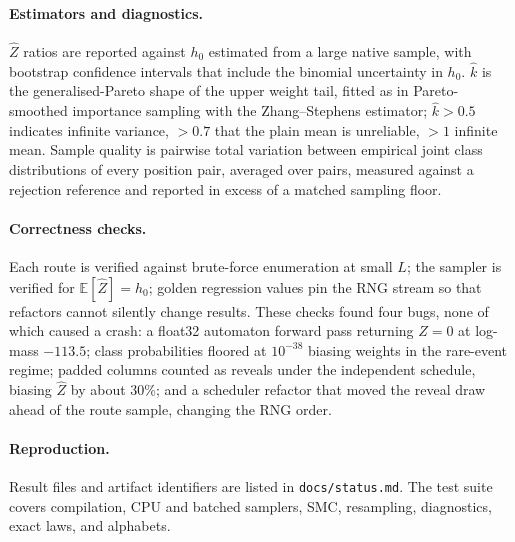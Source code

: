 \documentclass[11pt]{article}
\theoremstyle{definition}
\newcommand{\E}{\mathbb{E}}
\newcommand{\Zh}{\widehat Z}
\begin{document}
\paragraph{Estimators and diagnostics.}
$\Zh$ ratios are reported against $h_0$ estimated from a large native sample, with bootstrap confidence intervals
that include the binomial uncertainty in $h_0$. $\hat k$ is the generalised-Pareto shape of the upper weight tail,
fitted as in Pareto-smoothed importance sampling with the Zhang--Stephens estimator; $\hat k>0.5$ indicates
infinite variance, $>0.7$ that the plain mean is unreliable, $>1$ infinite mean. Sample quality is pairwise total
variation between empirical joint class distributions of every position pair, averaged over pairs, measured
against a rejection reference and reported in excess of a matched sampling floor.

\paragraph{Correctness checks.}
Each route is verified against brute-force enumeration at small $L$; the sampler is verified for $\E[\Zh]=h_0$;
golden regression values pin the RNG stream so that refactors cannot silently change results. These checks found
four bugs, none of which caused a crash: a float32 automaton forward pass returning
$Z=0$ at log-mass $-113.5$; class probabilities floored at $10^{-38}$ biasing weights in the rare-event regime;
padded columns counted as reveals under the independent schedule, biasing $\Zh$ by about 30\%; and a scheduler
refactor that moved the reveal draw ahead of the route sample, changing the RNG order.

\paragraph{Reproduction.}
Result files and artifact identifiers are listed in \texttt{docs/status.md}. The test suite covers compilation,
CPU and batched samplers, SMC, resampling, diagnostics, exact laws, and alphabets.
\end{document}
